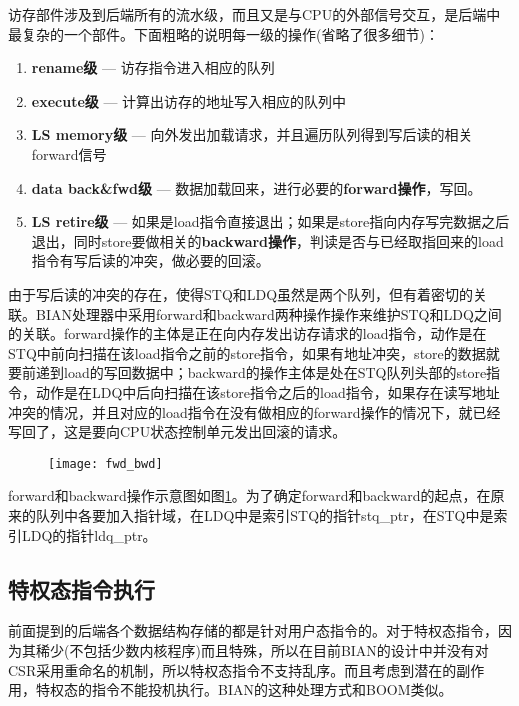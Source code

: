 访存部件涉及到后端所有的流水级，而且又是与CPU的外部信号交互，是后端中最复杂的一个部件。下面粗略的说明每一级的操作(省略了很多细节)：
\begin{enumerate}[label=(\alph*)]
	\item \textbf{rename级} --- 访存指令进入相应的队列
	\item \textbf{execute级} --- 计算出访存的地址写入相应的队列中
	\item \textbf{LS memory级} --- 向外发出加载请求，并且遍历队列得到写后读的相关forward信号
	\item \textbf{data back\&fwd级} --- 数据加载回来，进行必要的\textbf{forward操作}，写回。
	\item \textbf{LS retire级} --- 如果是load指令直接退出；如果是store指向内存写完数据之后退出，同时store要做相关的\textbf{backward操作}，判读是否与已经取指回来的load指令有写后读的冲突，做必要的回滚。
\end{enumerate}

由于写后读的冲突的存在，使得STQ和LDQ虽然是两个队列，但有着密切的关联。BIAN处理器中采用forward和backward两种操作操作来维护STQ和LDQ之间的关联。forward操作的主体是正在向内存发出访存请求的load指令，动作是在STQ中前向扫描在该load指令之前的store指令，如果有地址冲突，store的数据就要前递到load的写回数据中；backward的操作主体是处在STQ队列头部的store指令，动作是在LDQ中后向扫描在该store指令之后的load指令，如果存在读写地址冲突的情况，并且对应的load指令在没有做相应的forward操作的情况下，就已经写回了，这是要向CPU状态控制单元发出回滚的请求。
\begin{figure}[!htbp]
	\centering
	\texttt{[image: fwd\_bwd]}
	\label{fig:forward_backward}
\end{figure}

forward和backward操作示意图如图\ref{fig:forward_backward}。为了确定forward和backward的起点，在原来的队列中各要加入指针域，在LDQ中是索引STQ的指针stq\_ptr，在STQ中是索引LDQ的指针ldq\_ptr。


\subsection{特权态指令执行}
前面提到的后端各个数据结构存储的都是针对用户态指令的。对于特权态指令，因为其稀少(不包括少数内核程序)而且特殊，所以在目前BIAN的设计中并没有对CSR采用重命名的机制，所以特权态指令不支持乱序。而且考虑到潜在的副作用，特权态的指令不能投机执行。BIAN的这种处理方式和BOOM类似。
